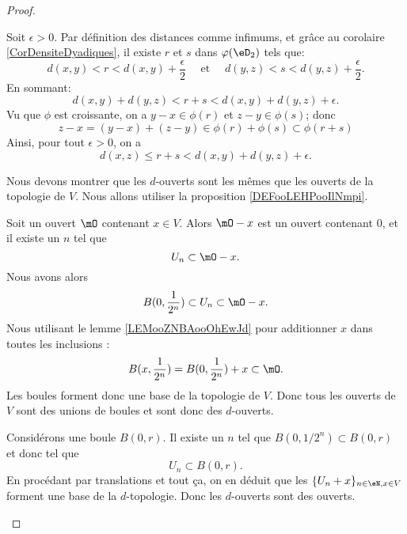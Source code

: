 \begin{proof}
\begin{subproof}
		Soit \(\epsilon > 0 \). Par définition des distances comme infimums, et grâce au corolaire \ref{CorDensiteDyadiques}, il existe \(r\) et \(s\) dans \( \varphi(\eD_2) \) tels que:
		\begin{equation}
			d(x,y) < r < d(x,y) + \frac \epsilon 2 \quad\text{ et }\quad d(y,z) < s < d(y,z) + \frac \epsilon 2 .
		\end{equation}
		En sommant:
		\begin{equation}
			d(x,y) + d(y,z) <  r + s < d(x,y)+d(y,z)+\epsilon.
		\end{equation}
		Vu que \( \phi\) est croissante, on a \(y - x \in \phi(r)\) et \(z - y \in \phi(s)\); donc
		\begin{equation}
			z-x = (y - x) + (z - y) \in \phi(r) + \phi(s) \subset \phi(r+s)
		\end{equation}
		Ainsi, pour tout \(\epsilon > 0 \), on a
		\begin{equation}
			d(x,z) \leq r+s < d(x,y) + d(y,z) + \epsilon.
		\end{equation}

		Nous devons montrer que les \( d\)-ouverts sont les mêmes que les ouverts de la topologie de \( V\). Nous allons utiliser la proposition \ref{DEFooLEHPooIlNmpi}.

		\begin{subproof}
			Soit un ouvert \( \mO\) contenant \( x\in V\). Alors \( \mO-x\) est un ouvert contenant \( 0\), et il existe un \( n\) tel que
			\begin{equation}
				U_n\subset \mO-x.
			\end{equation}
			Nous avons alors
			\begin{equation}
				B(0,\frac{1}{ 2^n })\subset U_n\subset \mO-x.
			\end{equation}
			Nous utilisant le lemme \ref{LEMooZNBAooOhEwJd} pour additionner \( x\) dans toutes les inclusions :
			\begin{equation}
				B(x,\frac{1}{ 2^n })=B(0,\frac{1}{ 2^n })+x\subset\mO.
			\end{equation}
			Les boules forment donc une base de la topologie de \( V\). Donc tous les ouverts de \( V\) sont des unions de boules et sont donc des \( d\)-ouverts.

			Considérons une boule \( B(0,r)\). Il existe un \( n\) tel que \( B(0,1/2^n)\subset B(0,r)\) et donc tel que
			\begin{equation}
				U_n\subset B(0,r).
			\end{equation}
			En procédant par translations et tout ça, on en déduit que les \( \{ U_n+x \}_{n\in \eN, x\in V}\) forment une base de la \( d\)-topologie. Donc les \( d\)-ouverts sont des ouverts.
		\end{subproof}
	\end{subproof}
\end{proof}

